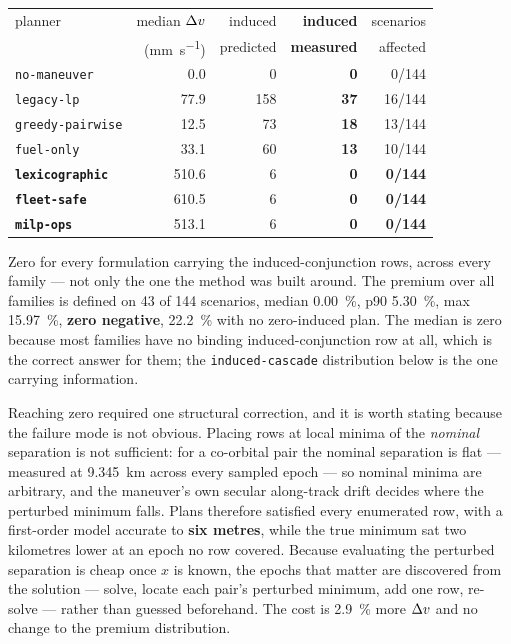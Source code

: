 \begin{center}
\begin{tabular}{lrrrr}
\toprule
planner & median $\Delta v$ & induced & \textbf{induced} & scenarios \\
        & (\si{\milli\meter\per\second}) & predicted & \textbf{measured} & affected \\
\midrule
\texttt{no-maneuver}     &   0.0 &   0 & \textbf{0}  &   0/144 \\
\texttt{legacy-lp}       &  77.9 & 158 & \textbf{37} &  16/144 \\
\texttt{greedy-pairwise} &  12.5 &  73 & \textbf{18} &  13/144 \\
\texttt{fuel-only}       &  33.1 &  60 & \textbf{13} &  10/144 \\
\textbf{\texttt{lexicographic}} & 510.6 & 6 & \textbf{0} & \textbf{0/144} \\
\textbf{\texttt{fleet-safe}}    & 610.5 & 6 & \textbf{0} & \textbf{0/144} \\
\textbf{\texttt{milp-ops}}      & 513.1 & 6 & \textbf{0} & \textbf{0/144} \\
\bottomrule
\end{tabular}
\end{center}

Zero for every formulation carrying the induced-conjunction rows, across every
family --- not only the one the method was built around. The premium over all
families is defined on 43 of 144 scenarios, median \SI{0.00}{\percent}, p90
\SI{5.30}{\percent}, max \SI{15.97}{\percent}, \textbf{zero negative},
\SI{22.2}{\percent} with no zero-induced plan. The median is zero because most
families have no binding induced-conjunction row at all, which is the correct
answer for them; the \texttt{induced-cascade} distribution below is the one
carrying information.

Reaching zero required one structural correction, and it is worth stating
because the failure mode is not obvious. Placing rows at local minima of the
\emph{nominal} separation is not sufficient: for a co-orbital pair the nominal
separation is flat --- measured at \SI{9.345}{\kilo\meter} across every sampled
epoch --- so nominal minima are arbitrary, and the maneuver's own secular
along-track drift decides where the perturbed minimum falls. Plans therefore
satisfied every enumerated row, with a first-order model accurate to
\textbf{six metres}, while the true minimum sat two kilometres lower at an
epoch no row covered. Because evaluating the perturbed separation is cheap once
$x$ is known, the epochs that matter are discovered from the solution --- solve,
locate each pair's perturbed minimum, add one row, re-solve --- rather than
guessed beforehand. The cost is \SI{2.9}{\percent} more $\Delta v$ and no change to
the premium distribution.

